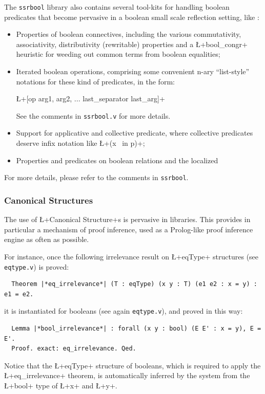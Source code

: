 The {\tt ssrbool} library also contains several tool-kits for handling
boolean predicates that become pervasive in a boolean small scale
reflection setting, like :
\begin{itemize}
\item Properties of boolean connectives, including the
  various commutativity, associativity, distributivity (rewritable)
  properties and a \L+bool_congr+ heuristic for weeding out common
  terms from boolean equalities;
\item Iterated boolean operations, comprising some convenient n-ary
  ``list-style'' notations for these kind of predicates, in the form:

\centerline{\L+[op arg1, arg2, ... last_separator last_arg]+}

\noindent See the comments in {\tt ssrbool.v} for more details.
\item Support for applicative and collective predicate, where
  collective predicates deserve infix notation like \L+(x \ in p)+;
\item Properties and predicates on boolean relations and the localized

\end{itemize}

For more details, please refer to the comments in {\tt ssrbool}.

\subsubsection*{Canonical Structures}

The use of \L+Canonical Structure+s is pervasive in \ssr{} libraries.
This provides in particular a mechanism of proof inference, used as a
Prolog-like proof inference engine as often as possible.

For instance, once the following irrelevance
result on \L+eqType+ structures (see {\tt eqtype.v}) is proved:
\begin{lstlisting}
  Theorem |*eq_irrelevance*| (T : eqType) (x y : T) (e1 e2 : x = y) : e1 = e2.
\end{lstlisting}
it is instantiated for booleans (see again \texttt{eqtype.v}), and
proved in this way:
\begin{lstlisting}
  Lemma |*bool_irrelevance*| : forall (x y : bool) (E E' : x = y), E = E'.
  Proof. exact: eq_irrelevance. Qed.
\end{lstlisting}
Notice that the \L+eqType+ structure of booleans, which is required to
apply the \L+eq_irrelevance+ theorem, is automatically
inferred by the system from the \L+bool+ type of \L+x+ and \L+y+.

